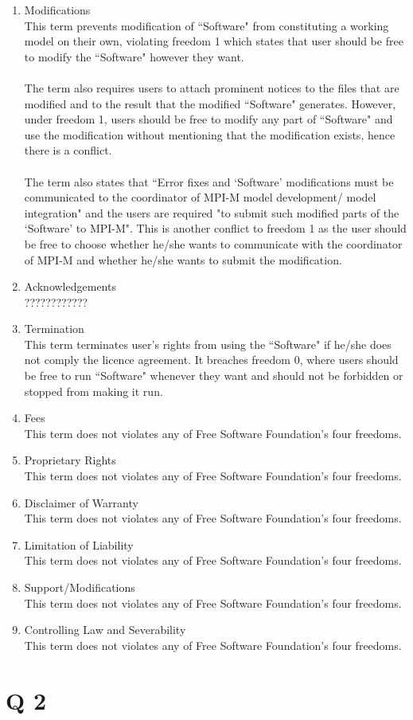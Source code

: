 \documentclass[a4paper]{article}
\begin{document}
\begin{enumerate}
\item Modifications
\\This term prevents modification of ``Software" from constituting a working model on their own, violating freedom 1 which states that user should be free to modify the ``Software" however they want.
\\
\\The term also requires users to attach prominent notices to the files that are modified and to the result that the modified ``Software" generates. However, under freedom 1, users should be free to modify any part of ``Software" and use the modification without mentioning that the modification exists, hence there is a conflict. 
\\
\\The term also states that ``Error fixes and `Software' modifications must be communicated to the coordinator of MPI-M model development/ model integration" and the users are required "to submit such modified parts of the `Software' to MPI-M". This is another conflict to freedom 1 as the user should be free to choose whether he/she wants to communicate with the coordinator of MPI-M and whether he/she wants to submit the modification. 

\item Acknowledgements
\\????????????
\item Termination
\\This term terminates user's rights from using the ``Software" if he/she does not comply the licence agreement. It breaches freedom 0, where users should be free to run ``Software" whenever they want and should not be forbidden or stopped from making it run.
\item Fees
\\ This term does not violates any of Free Software Foundation's four freedoms.
\item Proprietary Rights
\\ This term does not violates any of Free Software Foundation's four freedoms.
\item Disclaimer of Warranty
\\ This term does not violates any of Free Software Foundation's four freedoms.
\item Limitation of Liability
\\ This term does not violates any of Free Software Foundation's four freedoms.
\item Support/Modifications
\\ This term does not violates any of Free Software Foundation's four freedoms.
\item Controlling Law and Severability
\\ This term does not violates any of Free Software Foundation's four freedoms.
\end{enumerate}


\section*{Q 2}
\end{document}
